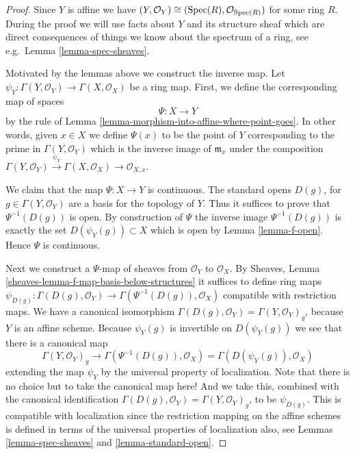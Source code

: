 \begin{proof}
Since $Y$ is affine we have
$(Y, \mathcal{O}_Y) \cong (\mathop{\mathrm{Spec}}(R), \mathcal{O}_{\mathop{\mathrm{Spec}}(R)})$
for some ring $R$.
During the proof we will use facts about $Y$ and
its structure sheaf which are direct consequences of things
we know about the spectrum of a ring, see e.g.\ Lemma
\ref{lemma-spec-sheaves}.

\medskip\noindent
Motivated by the lemmas above we construct the inverse map.
Let $\psi_Y : \Gamma(Y, \mathcal{O}_Y) \to \Gamma(X, \mathcal{O}_X)$
be a ring map. First, we define the corresponding map of
spaces
$$
\Psi : X \longrightarrow Y
$$
by the rule of
Lemma \ref{lemma-morphism-into-affine-where-point-goes}.
In other words, given $x \in X$ we define $\Psi(x)$
to be the point of $Y$ corresponding to the prime
in $\Gamma(Y, \mathcal{O}_Y)$ which is the inverse
image of $\mathfrak m_x$ under the composition
$
\Gamma(Y, \mathcal{O}_Y) \xrightarrow{\psi_Y}
\Gamma(X, \mathcal{O}_X) \to
\mathcal{O}_{X, x}
$.

\medskip\noindent
We claim that the map $\Psi : X \to Y$ is continuous.
The standard opens $D(g)$, for $g \in \Gamma(Y, \mathcal{O}_Y)$
are a basis for the topology of $Y$. Thus it suffices to prove
that $\Psi^{-1}(D(g))$ is open. By construction of $\Psi$
the inverse image $\Psi^{-1}(D(g))$ is exactly the set
$D(\psi_Y(g)) \subset X$ which is open by Lemma \ref{lemma-f-open}.
Hence $\Psi$ is continuous.

\medskip\noindent
Next we construct a $\Psi$-map of sheaves from
$\mathcal{O}_Y$ to $\mathcal{O}_X$. By
Sheaves, Lemma \ref{sheaves-lemma-f-map-basis-below-structures}
it suffices to define ring maps
$\psi_{D(g)} : \Gamma(D(g), \mathcal{O}_Y) \to
\Gamma(\Psi^{-1}(D(g)), \mathcal{O}_X)$
compatible with restriction maps.
We have a canonical isomorphism
$\Gamma(D(g), \mathcal{O}_Y) = \Gamma(Y, \mathcal{O}_Y)_g$,
because $Y$ is an affine scheme.
Because $\psi_Y(g)$ is invertible on $D(\psi_Y(g))$
we see that there is a canonical map
$$
\Gamma(Y, \mathcal{O}_Y)_g
\longrightarrow
\Gamma(\Psi^{-1}(D(g)), \mathcal{O}_X)
=
\Gamma(D(\psi_Y(g)), \mathcal{O}_X)
$$
extending the map $\psi_Y$
by the universal property of localization.
Note that there is no choice but to take the canonical map here!
And we take this, combined
with the canonical identification
$\Gamma(D(g), \mathcal{O}_Y) = \Gamma(Y, \mathcal{O}_Y)_g$, to
be $\psi_{D(g)}$. This is compatible with localization since the
restriction mapping on the affine schemes is defined in terms
of the universal properties of localization also, see
Lemmas \ref{lemma-spec-sheaves} and \ref{lemma-standard-open}.


\end{proof}
